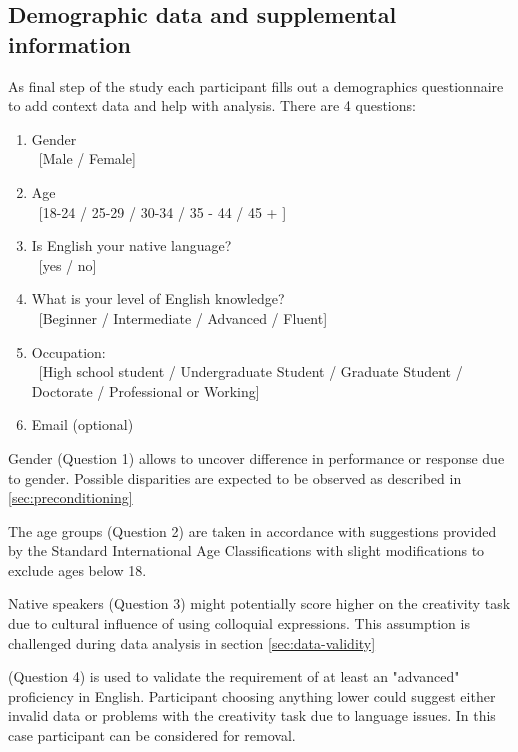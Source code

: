 	\subsection{Demographic data and supplemental information} \label{sec:demographics}
	
	As final step of the study each participant fills out a demographics questionnaire to add context data and help with analysis. There are 4 questions:
	
	\begin{enumerate}
		\item Gender \\ \ [Male / Female]
		\item Age \\ \ [18-24 / 25-29 / 30-34 / 35 - 44 / 45 + ]
		\item Is English your native language? \\ \ [yes / no]
		\item What is your level of English knowledge? \\ \
			[Beginner  / Intermediate / Advanced / Fluent]
		\item Occupation: \\ \ [High school student / Undergraduate Student / Graduate Student / Doctorate / Professional or Working]
		\item Email (optional)
	\end{enumerate}

	Gender (Question 1) allows to uncover difference in performance or response due to gender. Possible disparities are expected to be observed as described in \ref{sec:preconditioning}

	The age groups (Question 2) are taken in accordance with suggestions provided by the Standard International Age Classifications \cite{UN1982} with slight modifications to exclude ages below 18.
	
	
	Native speakers (Question 3) might potentially score higher on the creativity task due to cultural influence of using colloquial expressions. This assumption is challenged during data analysis in section \ref{sec:data-validity}
	
	(Question 4) is used to validate the requirement of at least an "advanced" proficiency in English. Participant choosing anything lower could suggest either invalid data or problems with the creativity task due to language issues. In this case participant can be considered for removal.
	
